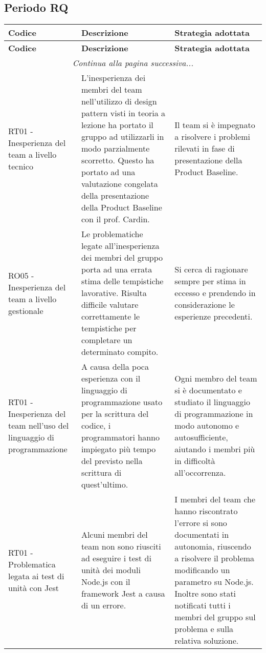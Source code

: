 \documentclass[../piano_di_progetto.tex]{subfiles}
\begin{document}
\subsection{Periodo RQ}
\label{sub:rischi_rq}
\begin{center}
	\begin{longtable}{|p{4cm}|p{6cm}|p{6cm}|}
		\hline
		\rowcolor{lightgray}
		{\textbf{Codice}} & {\textbf{Descrizione}} & {\textbf{Strategia adottata}} \\
		\hline
		\endfirsthead
	
		\hline
		\rowcolor{lightgray}
		{\textbf{Codice}} & {\textbf{Descrizione}} & {\textbf{Strategia adottata}} \\
		\hline
		\endhead
		
		\hline
		\multicolumn{3}{|c|}{\emph{Continua alla pagina successiva...}}\\
		\hline
		\endfoot

		\endlastfoot
        RT01 - Inesperienza del team a livello tecnico
        & L'inesperienza dei membri del team nell'utilizzo di design pattern visti in teoria a lezione ha portato il gruppo ad utilizzarli in modo parzialmente scorretto. Questo ha portato ad una valutazione congelata della presentazione della Product Baseline con il prof. Cardin. 
		& Il team si è impegnato a risolvere i problemi rilevati in fase di presentazione della Product Baseline. \\
		
		RO05 - Inesperienza del team a livello gestionale
        & Le problematiche legate all'inesperienza dei membri del gruppo porta ad una errata stima delle tempistiche lavorative. Risulta difficile valutare correttamente le tempistiche per completare un determinato compito. 
        & Si cerca di ragionare sempre per stima in eccesso e prendendo in considerazione le esperienze precedenti. \\
		
		RT01 - Inesperienza del team nell'uso del linguaggio di programmazione
        & A causa della poca esperienza con il linguaggio di programmazione usato per la scrittura del codice, i programmatori hanno impiegato più tempo del previsto nella scrittura di quest'ultimo.
		& Ogni membro del team si è documentato e studiato il linguaggio di programmazione in modo autonomo e autosufficiente, aiutando i membri più in difficoltà all'occorrenza.\\
		
		RT01 - Problematica legata ai test di unità con Jest
		& Alcuni membri del team non sono riusciti ad eseguire i test di unità dei moduli Node.js con il framework Jest a causa di un errore.
		& I membri del team che hanno riscontrato l'errore si sono documentati in autonomia, riuscendo a risolvere il problema modificando un parametro su Node.js. Inoltre sono stati notificati tutti i membri del gruppo sul problema e sulla relativa soluzione. \\
		

\end{longtable}
\end{center}
\end{document}
